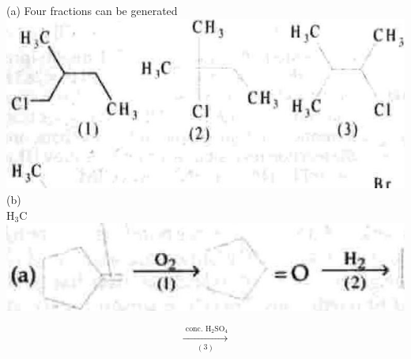 \documentclass[10pt]{article}
\begin{document}
(a) Four fractions can be generated\\
\includegraphics[max width=\textwidth, center]{2025_01_28_8470952b98110cec3aabg-247(9)}\\
(b)\\
$\mathrm{H}_{3} \mathrm{C}$\\
\includegraphics[max width=\textwidth, center]{2025_01_28_8470952b98110cec3aabg-247(4)}

$$
\xrightarrow[(3)]{\text { conc. } \mathrm{H}_{2} \mathrm{SO}_{4}}
$$
\end{document}
